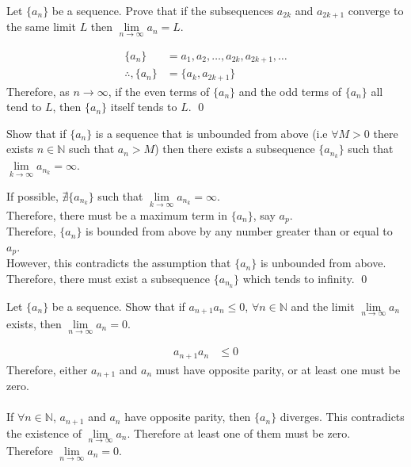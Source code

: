 \documentclass[fleqn, a4paper, 12pt, oneside]{amsart}
\theoremstyle{definition}
\theoremstyle{theorem}
\begin{document}
\begin{question}
	Let $\{a_n\}$ be a sequence.
	Prove that if the subsequences $a_{2 k}$ and $a_{2 k + 1}$ converge to the same limit $L$ then $\lim\limits_{n \to \infty} a_n = L$.
\end{question}

\begin{solution}
	\begin{align*}
		\{a_n\} &= a_1, a_2, \dots, a_{2 k}, a_{2 k + 1}, \dots\\
		\therefore, \{a_n\} &= \{a_k, a_{2 k + 1}\}
	\end{align*}
	Therefore, as $n \to \infty$, if the even terms of $\{a_n\}$ and the odd terms of $\{a_n\}$ all tend to $L$, then $\{a_n\}$ itself tends to $L$.
	\qed
\end{solution}

\begin{question}
	Show that if $\{a_n\}$ is a sequence that is unbounded from above (i.e $\forall M > 0$ there exists $n \in \mathbb{N}$ such that $a_n > M$) then there exists a subsequence $\{a_{n_k}\}$ such that $\lim\limits_{k \to \infty} a_{n_k} = \infty$.
\end{question}

\begin{solution}
	If possible, $\nexists \{a_{n_k}\}$ such that $\lim\limits_{k \to \infty} a_{n_k} = \infty$.\\
	Therefore, there must be a maximum term in $\{a_n\}$, say $a_p$.\\
	Therefore, $\{a_n\}$ is bounded from above by any number greater than or equal to $a_p$.\\
	However, this contradicts the assumption that $\{a_n\}$ is unbounded from above.
	Therefore, there must exist a subsequence $\{a_{n_k}\}$ which tends to infinity.
	\qed
\end{solution}

\begin{question}
	Let $\{a_n\}$ be a sequence.
	Show that if $a_{n + 1} a_n \le 0$, $\forall n \in \mathbb{N}$ and the limit $\lim\limits_{n \to \infty} a_n$ exists, then $\lim\limits_{n \to \infty} a_n = 0$.
\end{question}

\begin{solution}
	\begin{align*}
		a_{n + 1} a_n &\le 0
	\end{align*}
	Therefore, either $a_{n + 1}$ and $a_n$ must have opposite parity, or at least one must be zero.\\
	~\\
	If $\forall n \in \mathbb{N}$, $a_{n + 1}$ and $a_n$ have opposite parity, then $\{a_n\}$ diverges.
	This contradicts the existence of $\lim\limits_{n \to \infty} a_n$.
	Therefore at least one of them must be zero.\\
	Therefore $\lim\limits_{n \to \infty} a_n = 0$.
\end{solution}
\end{document}
